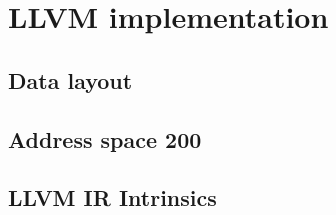 \chapter{LLVM implementation}
\section{Data layout}
\section{Address space 200}
\section{LLVM IR Intrinsics}


